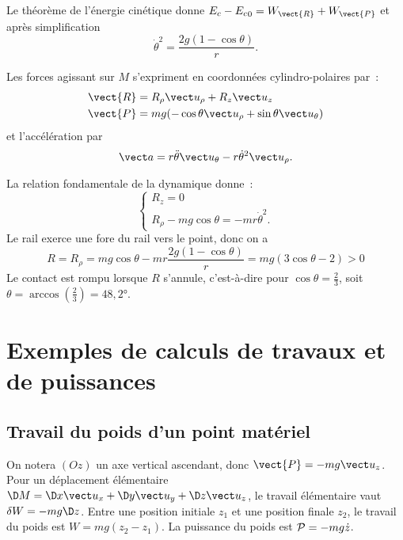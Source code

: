 Le théorème de l'énergie cinétique donne $E_c - {E_c}_{0} = W_{\vect{R}} + W_{\vect{P}}$ et après simplification
\begin{equation}
  \dot{\theta}^2 = \frac{2g(1-\cos\theta)}{r}.
\end{equation}

Les forces agissant sur $M$ s'expriment en coordonnées cylindro-polaires par~:
\begin{align}
  \vect{R} &= R_\rho \urho + R_z \uz \\
  \vect{P} &= mg(-\cos\theta \urho +\sin\theta \utheta)
\end{align}
et l'accélération par
\begin{equation}
  \va = r \ddot{\theta}\utheta -r\dot{\theta}^2\urho.
\end{equation}

La relation fondamentale de la dynamique donne~:
\begin{equation}
  \begin{cases}
    R_z = 0 \\
    R_\rho -mg\cos\theta =-mr\dot{\theta}^2.
  \end{cases}
\end{equation}
Le rail exerce une fore du rail vers le point, donc on a
\begin{equation}
  R=R_\rho = mg\cos\theta - mr \frac{2g(1-\cos\theta)}{r} = mg(3\cos\theta -2)>0
\end{equation}
Le contact est rompu lorsque $R$ s'annule, c'est-à-dire pour $\cos\theta = \frac{2}{3}$, soit $\theta = \arccos\left(\frac{2}{3}\right) = 48,2°$.

\section{Exemples de calculs de travaux et de puissances}
\label{chap-4sec:exemplesdecalculs}

\subsection{Travail du poids d'un point matériel}
\label{chap4-subsec:travaildupoids}

On notera $(Oz)$ un axe vertical ascendant, donc $\vect{P}=-mg\uz$. Pour un déplacement élémentaire $\D M = \D x \ux + \D y \uy + \D z \uz$, le travail élémentaire vaut $\delta W = -mg\D z$. Entre une position initiale $z_1$ et une position finale $z_2$, le travail du poids est $W=mg(z_2-z_1)$. La puissance du poids est $\P=-mg\dot{z}$.

